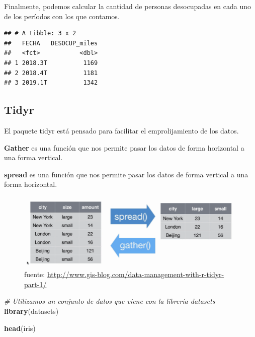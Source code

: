 \documentclass[]{book}
\newenvironment{Shaded}{\begin{snugshade}}{\end{snugshade}}
\newcommand{\CommentTok}[1]{\textcolor[rgb]{0.56,0.35,0.01}{\textit{#1}}}
\newcommand{\KeywordTok}[1]{\textcolor[rgb]{0.13,0.29,0.53}{\textbf{#1}}}
\newcommand{\NormalTok}[1]{#1}
\newcommand{\OperatorTok}[1]{\textcolor[rgb]{0.81,0.36,0.00}{\textbf{#1}}}
\newcommand{\StringTok}[1]{\textcolor[rgb]{0.31,0.60,0.02}{#1}}
\begin{document}
Finalmente, podemos calcular la cantidad de personas desocupadas en cada uno de los períodos con los que contamos.

\begin{Shaded}
\end{Shaded}

\begin{verbatim}
## # A tibble: 3 x 2
##   FECHA   DESOCUP_miles
##   <fct>           <dbl>
## 1 2018.3T          1169
## 2 2018.4T          1181
## 3 2019.1T          1342
\end{verbatim}

\hypertarget{tidyr}{%
\subsection{Tidyr}\label{tidyr}}

El paquete tidyr está pensado para facilitar el emprolijamiento de los datos.

\textbf{Gather} es una función que nos permite pasar los datos de forma horizontal a una forma vertical.

\textbf{spread} es una función que nos permite pasar los datos de forma vertical a una forma horizontal.

\begin{figure}
\centering
\includegraphics{img/spreadVSgather.png}
\caption{fuente: \url{http://www.gis-blog.com/data-management-with-r-tidyr-part-1/}}
\end{figure}

\begin{Shaded}
\begin{Highlighting}[]
\CommentTok{# Utilizamos un conjunto de datos que viene con la librería datasets}
\KeywordTok{library}\NormalTok{(datasets)}

\KeywordTok{head}\NormalTok{(iris)}
\end{Highlighting}
\end{Shaded}
\end{document}
